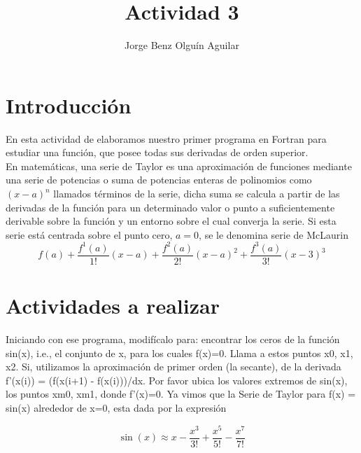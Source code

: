 \documentclass[12pt,a4paper,openright]{article}
\author{Jorge Benz Olguín Aguilar}
\title{Actividad 3}
\begin{document}
\section*{Introducción}

En esta actividad de elaboramos nuestro primer programa en Fortran para estudiar una función, que posee todas sus derivadas de orden superior. \\


En matemáticas, una serie de Taylor es una aproximación de funciones mediante una serie de potencias o suma de potencias enteras de polinomios como $( x-a )^n$ llamados términos de la serie, dicha suma se calcula a partir de las derivadas de la función para un determinado valor o punto a suficientemente derivable sobre la función y un entorno sobre el cual converja la serie. Si esta serie está centrada sobre el punto cero, $a=0$, se le denomina serie de McLaurin \\


$$
f(a)+\frac{f^1(a)}{1!}(x-a)+\frac{f^2(a)}{2!}(x-a)^2+\frac{f^3(a)}{3!}(x-3)^3 
$$



\section*{Actividades a realizar}


Iniciando con ese programa, modifícalo para:
encontrar los ceros de la función sin(x), i.e., el conjunto de x, para los cuales f(x)=0. Llama a estos puntos x0, x1, x2.
Si, utilizamos la aproximación de primer orden (la secante), de la derivada f'(x(i)) = (f(x(i+1) - f(x(i)))/dx. Por favor ubica los valores extremos de sin(x), los puntos xm0, xm1,  donde f'(x)=0.
Ya vimos que la Serie de Taylor para f(x) = sin(x) alrededor de x=0, esta dada por la expresión 

$$\sin(x)\approx x-\frac{x^3}{3!}+\frac{x^5}{5!}-\frac{x^7}{7!}
$$
\end{document}
